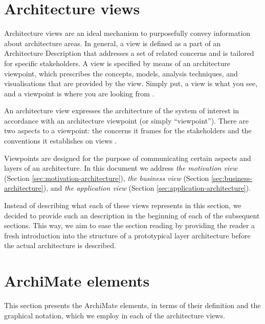 	\section{Architecture views}
	\label{sec:views}
	
	
	Architecture views are an ideal mechanism to purposefully convey information about architecture areas. In general, a view is defined as a part of an Architecture Description that addresses a set of related concerns and is tailored for specific stakeholders. A view is specified by means of an architecture viewpoint, which prescribes the concepts, models, analysis techniques, and visualisations that are provided by the view. Simply put, a view is what you see, and a viewpoint is where you are looking from \citep{archimate3.1}.
	
	An architecture view expresses the architecture of the system of interest in accordance with an architecture viewpoint (or simply ``viewpoint''). There are two aspects to a viewpoint: the concerns it frames for the stakeholders and the conventions it establishes on views \citep{archimate3.1}.

	Viewpoints are designed for the purpose of communicating certain aspects and layers of an architecture. In this document we address \textit{the motivation view} (Section \ref{sec:motivation-architecture}), \textit{the business view} (Section \ref{sec:business-architecture}), and \textit{the application view} (Section \ref{sec:application-architecture}).
	
	Instead of describing what each of these views represents in this section, we decided to provide such an description in the beginning of each of the subsequent sections. This way, we aim to ease the section reading by providing the reader a fresh introduction into the structure of a prototypical layer architecture before the actual architecture is described.
	
	\section{ArchiMate elements}
	
    This section presents the ArchiMate elements, in terms of their definition and the graphical notation, which we employ in each of the architecture views. 


